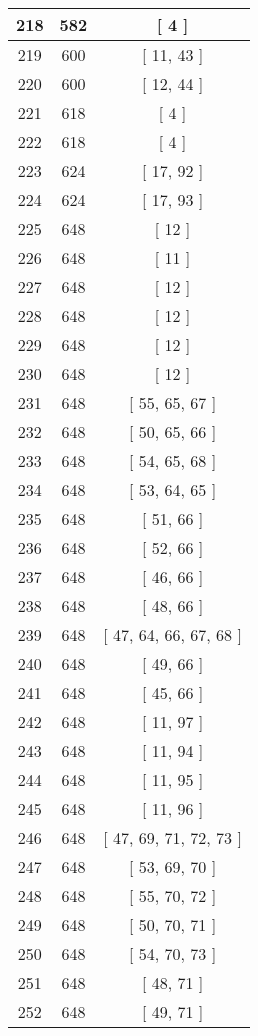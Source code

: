 \begin{center}
\begin{longtable}[H]{|| c c c ||}
\hline
218 & 582 & [ 4 ] \\ 
\hline
219 & 600 & [ 11, 43 ] \\ 
\hline
220 & 600 & [ 12, 44 ] \\ 
\hline
221 & 618 & [ 4 ] \\ 
\hline
222 & 618 & [ 4 ] \\ 
\hline
223 & 624 & [ 17, 92 ] \\ 
\hline
224 & 624 & [ 17, 93 ] \\ 
\hline
225 & 648 & [ 12 ] \\ 
\hline
226 & 648 & [ 11 ] \\ 
\hline
227 & 648 & [ 12 ] \\ 
\hline
228 & 648 & [ 12 ] \\ 
\hline
229 & 648 & [ 12 ] \\ 
\hline
230 & 648 & [ 12 ] \\ 
\hline
231 & 648 & [ 55, 65, 67 ] \\ 
\hline
232 & 648 & [ 50, 65, 66 ] \\ 
\hline
233 & 648 & [ 54, 65, 68 ] \\ 
\hline
234 & 648 & [ 53, 64, 65 ] \\ 
\hline
235 & 648 & [ 51, 66 ] \\ 
\hline
236 & 648 & [ 52, 66 ] \\ 
\hline
237 & 648 & [ 46, 66 ] \\ 
\hline
238 & 648 & [ 48, 66 ] \\ 
\hline
239 & 648 & [ 47, 64, 66, 67, 68 ] \\ 
\hline
240 & 648 & [ 49, 66 ] \\ 
\hline
241 & 648 & [ 45, 66 ] \\ 
\hline
242 & 648 & [ 11, 97 ] \\ 
\hline
243 & 648 & [ 11, 94 ] \\ 
\hline
244 & 648 & [ 11, 95 ] \\ 
\hline
245 & 648 & [ 11, 96 ] \\ 
\hline
246 & 648 & [ 47, 69, 71, 72, 73 ] \\ 
\hline
247 & 648 & [ 53, 69, 70 ] \\ 
\hline
248 & 648 & [ 55, 70, 72 ] \\ 
\hline
249 & 648 & [ 50, 70, 71 ] \\ 
\hline
250 & 648 & [ 54, 70, 73 ] \\ 
\hline
251 & 648 & [ 48, 71 ] \\ 
\hline
252 & 648 & [ 49, 71 ] \\ 

\end{longtable}
\end{center}
